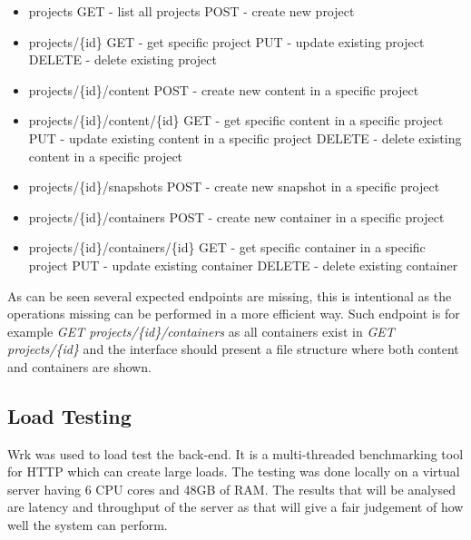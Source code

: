 \documentclass[a4paper,12pt]{article}
\begin{document}
\begin{itemize}
  \item projects
      \subitem GET - list all projects
      \subitem POST - create new project
  \item projects/\{id\}
      \subitem GET - get specific project
      \subitem PUT - update existing project
      \subitem DELETE - delete existing project
  \item projects/\{id\}/content
      \subitem POST - create new content in a specific project 
  \item projects/\{id\}/content/\{id\}
      \subitem GET - get specific content in a specific project
      \subitem PUT - update existing content in a specific project
      \subitem DELETE - delete existing content in a specific project

  \item projects/\{id\}/snapshots
      \subitem POST - create new snapshot in a specific project 

  \item projects/\{id\}/containers
      \subitem POST - create new container in a specific project 
  \item projects/\{id\}/containers/\{id\}
      \subitem GET - get specific container in a specific project
      \subitem PUT - update existing container
      \subitem DELETE - delete existing container
\end{itemize}

As can be seen several expected endpoints are missing, this is intentional as the operations missing
can be performed in a more efficient way. Such endpoint is for example \textit{GET 
projects/\{id\}/containers} as all containers exist in \textit{GET projects/\{id\}} and the interface
should present a file structure where both content and containers are shown.

\newpage
\subsection{Load Testing} \label{sec:load_testing}
Wrk was used to load test the back-end. It is a multi-threaded benchmarking tool for HTTP which can
create large loads. The testing was done locally on a virtual server having 6 CPU cores and 48GB of
RAM. The results that will be analysed are latency and throughput of the server as that will give a 
fair judgement of how well the system can perform.
\end{document}
